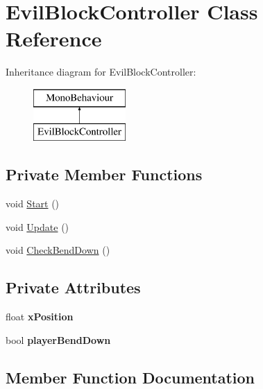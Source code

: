 \hypertarget{class_evil_block_controller}{}\section{Evil\+Block\+Controller Class Reference}
\label{class_evil_block_controller}
Inheritance diagram for Evil\+Block\+Controller\+:\begin{figure}[H]
\begin{center}
\leavevmode
\includegraphics[height=2.000000cm]{class_evil_block_controller}
\end{center}
\end{figure}
\subsection*{Private Member Functions}
\begin{DoxyCompactItemize}
\item 
void \mbox{\hyperlink{class_evil_block_controller_a886850dc23ca46aa4f52733f8b5416b3}{Start}} ()
\item 
void \mbox{\hyperlink{class_evil_block_controller_aec96a96d09990cc28e52383ad41d9e12}{Update}} ()
\item 
void \mbox{\hyperlink{class_evil_block_controller_a9ab8b9018ba6d78ad64133972d993a88}{Check\+Bend\+Down}} ()
\end{DoxyCompactItemize}
\subsection*{Private Attributes}
\begin{DoxyCompactItemize}
\item 
\mbox{\label{class_evil_block_controller_a4252a9cc51f1e0ba0cdd0a4c9a65fc28}} 
float {\bfseries x\+Position}
\item 
\mbox{\label{class_evil_block_controller_a07eac235b8e23588a4348f89fb6fa174}} 
bool {\bfseries player\+Bend\+Down}
\end{DoxyCompactItemize}


\subsection{Member Function Documentation}
\mbox{\label{class_evil_block_controller_a9ab8b9018ba6d78ad64133972d993a88}} 
